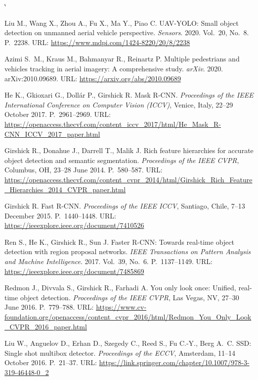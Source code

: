 \documentclass[14pt,a4paper]{extreport}
\makeatletter
\renewcommand\@biblabel[1]{#1.}
\renewenvironment{thebibliography}[1]{%
  \list{\@biblabel{\@arabic\c@enumiv}}{%
    \settowidth\labelwidth{\@biblabel{#1}}%
    \leftmargin\labelwidth
    \advance\leftmargin\labelsep
    \usecounter{enumiv}%
    \let\p@enumiv\@empty
    \renewcommand\theenumiv{\@arabic\c@enumiv}}%
  \sloppy\clubpenalty4000\widowpenalty4000\sfcode`\.\@m}
  {\def\@noitemerr{\@latex@warning{Empty `thebibliography' environment}}\endlist}
\makeatother
\begin{document}
\begin{thebibliography}{15}

Liu M., Wang X., Zhou A., Fu X., Ma Y., Piao C. UAV-YOLO: Small object
detection on unmanned aerial vehicle perspective. \textit{Sensors}. 2020.
Vol.~20, No.~8. P.~2238.
URL: \url{https://www.mdpi.com/1424-8220/20/8/2238}

Azimi S.~M., Kraus M., Bahmanyar R., Reinartz P. Multiple pedestrians
and vehicles tracking in aerial imagery: A comprehensive study.
\textit{arXiv}. 2020. arXiv:2010.09689.
URL: \url{https://arxiv.org/abs/2010.09689}

He K., Gkioxari G., Dollár P., Girshick R. Mask R-CNN.
\textit{Proceedings of the IEEE International Conference on Computer
Vision (ICCV)}, Venice, Italy, 22--29 October 2017. P.~2961--2969.
URL: \url{https://openaccess.thecvf.com/content_iccv_2017/html/He_Mask_R-CNN_ICCV_2017_paper.html}

Girshick R., Donahue J., Darrell T., Malik J. Rich feature hierarchies
for accurate object detection and semantic segmentation.
\textit{Proceedings of the IEEE CVPR}, Columbus, OH, 23--28 June 2014.
P.~580--587.
URL: \url{https://openaccess.thecvf.com/content_cvpr_2014/html/Girshick_Rich_Feature_Hierarchies_2014_CVPR_paper.html}

Girshick R. Fast R-CNN.
\textit{Proceedings of the IEEE ICCV}, Santiago, Chile, 7--13 December
2015. P.~1440--1448.
URL: \url{https://ieeexplore.ieee.org/document/7410526}

Ren S., He K., Girshick R., Sun J. Faster R-CNN: Towards real-time
object detection with region proposal networks.
\textit{IEEE Transactions on Pattern Analysis and Machine Intelligence}.
2017. Vol.~39, No.~6. P.~1137--1149.
URL: \url{https://ieeexplore.ieee.org/document/7485869}

Redmon J., Divvala S., Girshick R., Farhadi A. You only look once:
Unified, real-time object detection.
\textit{Proceedings of the IEEE CVPR}, Las Vegas, NV, 27--30 June 2016.
P.~779--788.
URL: \url{https://www.cv-foundation.org/openaccess/content_cvpr_2016/html/Redmon_You_Only_Look_CVPR_2016_paper.html}

Liu W., Anguelov D., Erhan D., Szegedy C., Reed S., Fu C.-Y., Berg A.~C.
SSD: Single shot multibox detector.
\textit{Proceedings of the ECCV}, Amsterdam, 11--14 October 2016.
P.~21--37.
URL: \url{https://link.springer.com/chapter/10.1007/978-3-319-46448-0_2}


\end{thebibliography}
\end{document}
